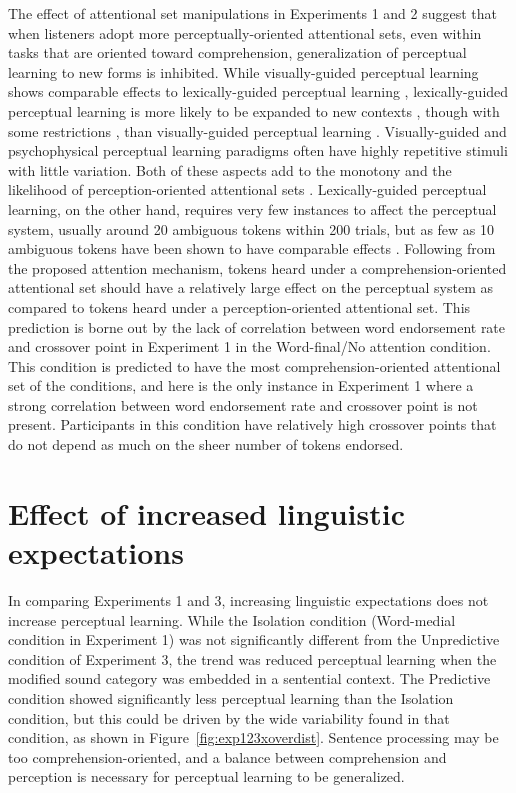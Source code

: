 The effect of attentional set manipulations in Experiments 1 and 2 suggest that when listeners adopt more perceptually-oriented attentional sets, even within tasks that are oriented toward comprehension, generalization of perceptual learning to new forms is inhibited.
While visually-guided perceptual learning shows comparable effects to lexically-guided perceptual learning \citep{vanLinden2007}, lexically-guided perceptual learning is more likely to be expanded to new contexts \citep{Norris2003, Kraljic2008a}, though with some restrictions \citep{Mitterer2013}, than visually-guided perceptual learning \citep{Reinisch2014}.
Visually-guided and psychophysical perceptual learning paradigms often have highly repetitive stimuli with little variation.  
Both of these aspects add to the monotony and the likelihood of perception-oriented attentional sets \citep{Cutler1987}.
Lexically-guided perceptual learning, on the other hand, requires very few instances to affect the perceptual system, usually around 20 ambiguous tokens within 200 trials, but as few as 10 ambiguous tokens have been shown to have comparable effects \citep{Kraljic2008}.
Following from the proposed attention mechanism, tokens heard under a comprehension-oriented attentional set should have a relatively large effect on the perceptual system as compared to tokens heard under a perception-oriented attentional set.
This prediction is borne out by the lack of correlation between word endorsement rate and crossover point in Experiment 1 in the Word-final/No attention condition.
This condition is predicted to have the most comprehension-oriented attentional set of the conditions, and here is the only instance in Experiment 1 where a strong correlation between word endorsement rate and crossover point is not present.
Participants in this condition have relatively high crossover points that do not depend as much on the sheer number of tokens endorsed.

\section{Effect of increased linguistic expectations}

In comparing Experiments 1 and 3, increasing linguistic expectations does not increase perceptual learning.  
While the Isolation condition (Word-medial condition in Experiment 1) was not significantly different from the Unpredictive condition of Experiment 3, the trend was reduced perceptual learning when the modified sound category was embedded in a sentential context.
The Predictive condition showed significantly less perceptual learning than the Isolation condition, but this could be driven by the wide variability found in that condition, as shown in Figure~\ref{fig:exp123xoverdist}.
Sentence processing may be too comprehension-oriented, and a balance between comprehension and perception is necessary for perceptual learning to be generalized.

